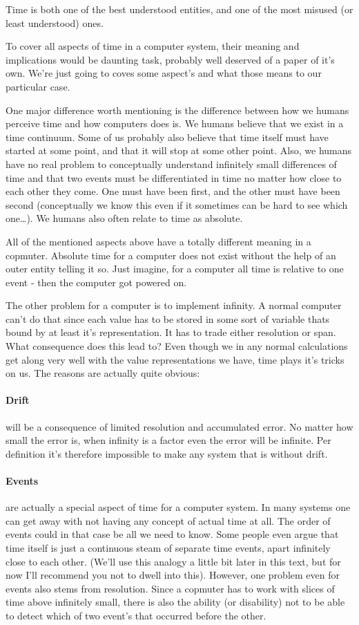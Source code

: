 		Time is both one of the best understood entities, and one of the most misused (or least understood) ones.

		To cover all aspects of time in a computer system, their meaning and implications would be daunting task, probably well deserved of a paper of it's own. We're just going to coves some aspect's and what those means to our particular case.

		One major difference worth mentioning is the difference between how we humans perceive time and how computers does is. We humans believe that we exist in a time continuum. Some of us probably also believe that time itself must have started at some point, and that it will stop at some other point. Also, we humans have no real problem to conceptually understand infinitely small differences of time and that two events must be differentiated in time no matter how close to each other they come. One must have been first, and the other must have been second (conceptually we know this even if it sometimes can be hard to see which one\ldots). We humans also often relate to time as absolute.

		All of the mentioned aspects above have a totally different meaning in a copmuter. Absolute time for a computer does not exist without the help of an outer entity telling it so. Just imagine, for a computer all time is relative to one event - then the computer got powered on.

		The other problem for a computer is to implement infinity. A normal computer can't do that since each value has to be stored in some sort of variable thats bound by at least it's representation. It has to trade either resolution or span. What consequence does this lead to? Even though we in any normal calculations get along very well with the value representations we have, time plays it's tricks on us. The reasons are actually quite obvious: 

		\paragraph{Drift} will be a consequence of limited resolution and accumulated error. No matter how small the error is, when infinity is a factor even the error will be infinite. Per definition it's therefore impossible to make any system that is without drift.

		\paragraph{Events} are actually a special aspect of time for a computer system. In many systems one can get away with not having any concept of actual time at all. The order of events could in that case be all we need to know. Some people even argue that time itself is just a continuous steam of separate time events, apart infinitely close to each other. (We'll use this analogy a little bit later in this text, but for now I'll recommend you not to dwell into this). However, one problem even for events also stems from resolution. Since a copmuter has to work with slices of time above infinitely small, there is also the ability (or disability) not to be able to detect which of two event's that occurred before the other.

